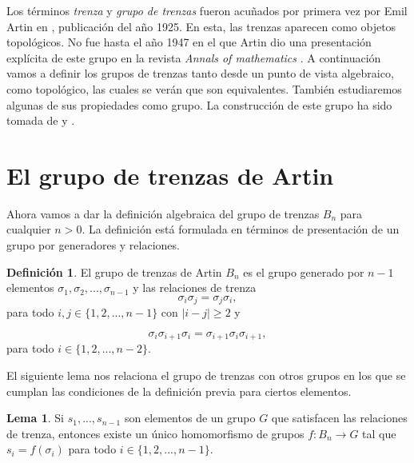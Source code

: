 \documentclass[12pt]{book}
\theoremstyle{definition}
\newtheorem{defi}{Definición}[section]
\newtheorem{lema}{Lema}[section]
\begin{document}
\newpage

Los términos \textit{trenza} y \textit{grupo de trenzas} fueron acuñados por primera vez por Emil Artin en \cite{Art1}, publicación del año 1925. En esta, las trenzas aparecen como objetos topológicos. No fue hasta el año 1947 en el que Artin dio una presentación explícita de este grupo en la revista \textit{Annals of mathematics} \cite{Art2}. A continuación vamos a definir los grupos de trenzas tanto desde un punto de vista algebraico, como topológico, las cuales se verán que son equivalentes. También estudiaremos algunas de sus propiedades como grupo. La construcción de este grupo ha sido tomada de  \cite{br_gr} y \cite{st_br}.

\section{El grupo de trenzas de Artin}



Ahora vamos a dar la definición algebraica del grupo de trenzas $B_n$ para cualquier $n>0$. La definición está formulada en términos de presentación de un grupo por generadores y relaciones.

\begin{defi}
El grupo de trenzas de Artin $B_n$ es el grupo generado por $n-1$ elementos $\sigma_1, \sigma_2,...,\sigma_{n-1}$ y las relaciones de trenza
$$\sigma_i\sigma_j = \sigma_j\sigma_i,$$
para todo $i,j\in\{1,2,...,n-1\}$ con $|i-j|\geq 2$ y

$$\sigma_i\sigma_{i+1}\sigma_i =\sigma_{i+1}\sigma_i\sigma_{i+1},$$
para todo $i\in\{1,2,...,n-2\}$.
\label{defi:artin}
\end{defi}

El siguiente lema nos relaciona el grupo de trenzas con otros grupos en los que se cumplan las condiciones de la definición previa para ciertos elementos.

\begin{lema}
Si $s_1,...,s_{n-1}$ son elementos de un grupo $G$ que satisfacen las relaciones de trenza, entonces existe un único homomorfismo de grupos $f:B_n\rightarrow G$ tal que $s_i = f(\sigma_i)$ para todo $i\in\{1,2,...,n-1\}$.
\label{uni_homo}
\end{lema}
\end{document}
